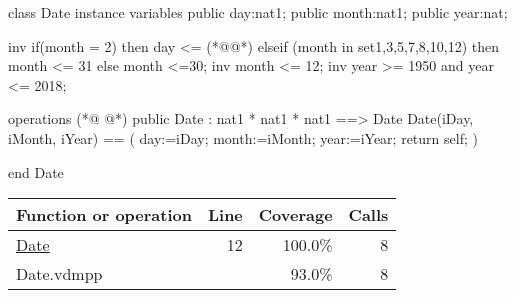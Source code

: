\begin{vdmpp}[breaklines=true]
class Date
instance variables
  public day:nat1;
  public month:nat1;
  public year:nat;
 
 inv if(month = 2) then day <= (*@@*) elseif (month in set{1,3,5,7,8,10,12}) then month <= 31 else month <=30;
 inv month <= 12;
 inv year >= 1950 and year <= 2018;

operations
(*@
\label{Date:12}
@*)
  public  Date : nat1 * nat1 * nat1  ==> Date
  Date(iDay, iMonth, iYear) == (
   day:=iDay;
   month:=iMonth;
   year:=iYear;
   return self;
  )

end Date
\end{vdmpp}
\bigskip
\begin{longtable}{|l|r|r|r|}
\hline
Function or operation & Line & Coverage & Calls \\
\hline
\hline
\hyperref[Date:12]{Date} & 12&100.0\% & 8 \\
\hline
\hline
Date.vdmpp & & 93.0\% & 8 \\
\hline
\end{longtable}

